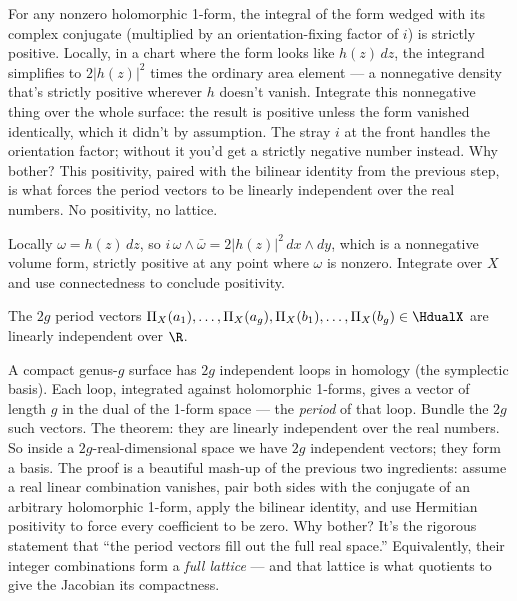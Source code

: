 \begin{layman}
For any nonzero holomorphic 1-form, the integral of the form wedged with
its complex conjugate (multiplied by an orientation-fixing factor of
\(i\)) is strictly positive. Locally, in a chart where the form looks
like \(h(z)\,dz\), the integrand simplifies to \(2|h(z)|^2\) times the
ordinary area element — a nonnegative density that's strictly positive
wherever \(h\) doesn't vanish. Integrate this nonnegative thing over
the whole surface: the result is positive unless the form vanished
identically, which it didn't by assumption. The stray \(i\) at the
front handles the orientation factor; without it you'd get a strictly
negative number instead. Why bother? This positivity, paired with the
bilinear identity from the previous step, is what forces the period
vectors to be linearly independent over the real numbers. No
positivity, no lattice.
\end{layman}

\begin{proofsketch}
Locally \(\omega = h(z)\,dz\), so
\(i\,\omega\wedge\bar\omega = 2|h(z)|^{2}\,dx\wedge dy\),
which is a nonnegative volume form, strictly positive at any point
where \(\omega\) is nonzero. Integrate over \(X\) and use connectedness
to conclude positivity.
\end{proofsketch}

\begin{theorem}
\label{thm:period-vectors-full-real-rank}
The \(2g\) period vectors
\(\Pi_X(a_1),\dots,\Pi_X(a_g),\Pi_X(b_1),\dots,\Pi_X(b_g)
   \in\HdualX\)
are linearly independent over \(\R\).
\leanok
\end{theorem}

\begin{layman}
A compact genus-\(g\) surface has \(2g\) independent loops in homology
(the symplectic basis). Each loop, integrated against holomorphic
1-forms, gives a vector of length \(g\) in the dual of the 1-form
space — the \emph{period} of that loop. Bundle the \(2g\) such
vectors. The theorem: they are linearly independent over the real
numbers. So inside a \(2g\)-real-dimensional space we have \(2g\)
independent vectors; they form a basis. The proof is a beautiful
mash-up of the previous two ingredients: assume a real linear
combination vanishes, pair both sides with the conjugate of an arbitrary
holomorphic 1-form, apply the bilinear identity, and use Hermitian
positivity to force every coefficient to be zero. Why bother? It's the
rigorous statement that ``the period vectors fill out the full real
space.'' Equivalently, their integer combinations form a \emph{full
lattice} — and that lattice is what quotients to give the Jacobian its
compactness.
\end{layman}

